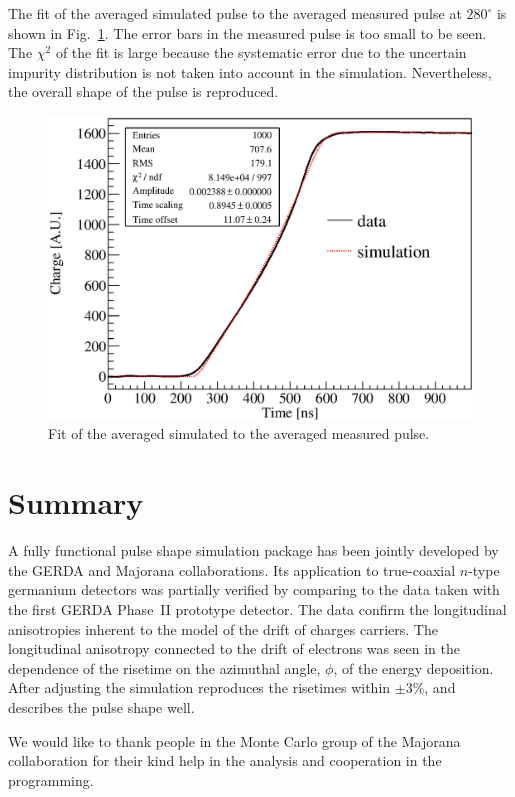 \documentclass[epj,referee]{svjour}
\begin{document}
The fit of the averaged simulated pulse to the averaged measured pulse
at $280^{\circ}$ is shown in Fig.~\ref{f:ave}. The error bars in the
measured pulse is too small to be seen. The $\chi^{2}$ of the fit is
large because the systematic error due to the uncertain impurity
distribution is not taken into account in the simulation.
Nevertheless, the overall shape of the pulse is reproduced.

\begin{figure}[htbp]
\centering
\includegraphics[width=\linewidth]{averagedSim2Dat280}
\caption{Fit of the averaged simulated to the averaged measured
pulse.}
\label{f:ave}
\end{figure}


\section{Summary}
\label{s:sum}
A fully functional pulse shape simulation package has been jointly
developed by the GERDA and Majorana collaborations. Its application to
true-coaxial $n$-type germanium detectors was partially verified by
comparing to the data taken with the first GERDA Phase~II prototype
detector. The data confirm the longitudinal anisotropies inherent to
the model of the drift of charges carriers. The longitudinal
anisotropy connected to the drift of electrons was seen in the
dependence of the risetime on the azimuthal angle, $\phi$, of the
energy deposition. After adjusting the simulation reproduces the
risetimes within $\pm$3\%, and describes the pulse shape well.

\begin{acknowledgement}
We would like to thank people in the Monte Carlo group of the Majorana
collaboration for their kind help in the analysis and cooperation in
the programming.
\end{acknowledgement}
\end{document}
